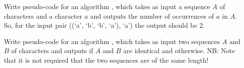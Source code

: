 \documentclass{article}
\begin{document}
\begin{Exercise}

    \Question
    Write pseudo-code for an algorithm , which takes as
    input a sequence $A$ of characters and a character $a$ and outputs the
    number of occurrences of $a$ in $A$. So, for the input pair ((`a', `b', `b',
    `a'), `a') the output should be 2.
    
    \medskip
    \Question
    Write pseudo-code for an algorithm , which takes as
    input two sequences $A$ and $B$ of characters and outputs  if
    $A$ and $B$ are identical and  otherwise. NB: Note that it is
    not required that the two sequences are of the same length!
    
\end{Exercise}
\end{document}
